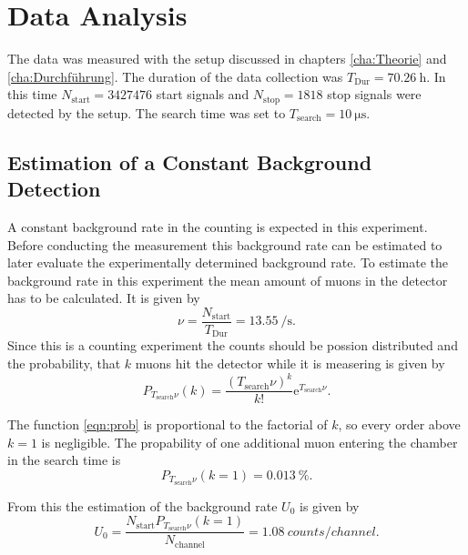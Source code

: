 \chapter{Data Analysis}
\label{cha:Auswertung}
The data was measured with the setup discussed in chapters \ref{cha:Theorie} and \ref{cha:Durchführung}. The duration of the data collection was $T_\mathrm{Dur} = \qty{70.26}{\hour}$. In this 
time $N_{\mathrm{start}} = \num{3427476}$ start signals and $N_{\mathrm{stop}} = \num{1818}$ stop signals were detected by the setup. The search time was set to 
$T_\mathrm{search} = \qty{10}{\micro\second}$.

\section{Estimation of a Constant Background Detection}
\label{sec:background}
A constant background rate in the counting is expected in this experiment. Before conducting the measurement this background rate can be estimated to later evaluate the experimentally 
determined background rate. To estimate the background rate in this experiment the mean amount of muons in the detector has to be calculated. It is given by 
\begin{equation}
    \label{eqn:muon_amount}
    \nu = \frac{N_\mathrm{start}}{T_\mathrm{Dur}} = \qty{13.55}{\per\second} .
\end{equation}
Since this is a counting experiment the counts should be possion distributed and the probability, that $k$ muons hit the detector while it is measering is given by
\begin{equation}
    \label{eqn:prob}
    P_{T_\mathrm{search}\nu}(k) = \frac{(T_\mathrm{search}\nu)^k}{k!}\mathrm{e}^{T_\mathrm{search}\nu} .
\end{equation}

The function \ref{eqn:prob} is proportional to the factorial of $k$, so every order above $k=1$ is negligible. The propability of one additional muon entering the chamber in the 
search time is 
\begin{equation*}
    P_{T_\mathrm{search}\nu}(k=1) = \qty{0.013}{\percent} .
\end{equation*}

From this the estimation of the background rate $U_0$ is given by 
\begin{equation}
    \label{eqn:background}
    U_0 = \frac{N_\mathrm{start}P_{T_\mathrm{search}\nu}(k=1)}{N_\mathrm{channel}} = \qty{1.08}{counts\per channel} .
\end{equation}

